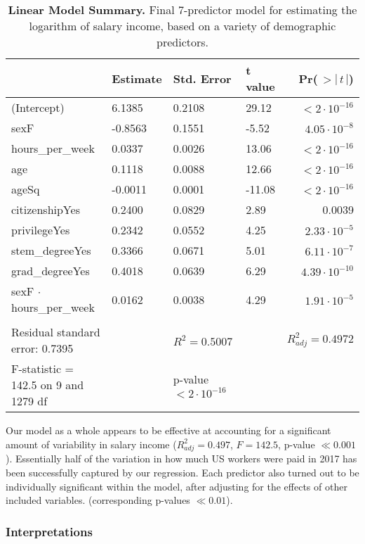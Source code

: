 \documentclass{article}
\begin{document}
\begin{table}[ht]
\centering
\begin{tabular}{llllr}
  \toprule
  & Estimate & Std. Error & t value & Pr($\,>|\,t\,|$) \\ 
  \midrule
  (Intercept) & 6.1385 & 0.2108 & 29.12 & $< 2 \cdot 10^{-16}$ \\ 
  sexF & -0.8563 & 0.1551 & -5.52 & $4.05 \cdot 10^{-8}$ \\ 
  hours\_per\_week & 0.0337 & 0.0026 & 13.06 & $< 2 \cdot 10^{-16}$ \\ 
  age & 0.1118 & 0.0088 & 12.66 & $< 2 \cdot 10^{-16}$ \\ 
  ageSq & -0.0011 & 0.0001 & -11.08 & $< 2 \cdot 10^{-16}$ \\ 
  citizenshipYes & 0.2400 & 0.0829 & 2.89 & 0.0039 \\ 
  privilegeYes & 0.2342 & 0.0552 & 4.25 & $2.33 \cdot 10^{-5}$ \\ 
  stem\_degreeYes & 0.3366 & 0.0671 & 5.01 & $6.11 \cdot 10^{-7}$ \\ 
  grad\_degreeYes & 0.4018 & 0.0639 & 6.29 & $4.39 \cdot 10^{-10}$ \\ 
  sexF $\cdot$ hours\_per\_week & 0.0162 & 0.0038 & 4.29 & $1.91 \cdot 10^{-5}$ \\ 
  \bottomrule \\
  Residual standard error: 0.7395 & & $R^2 = 0.5007$ &  & $R^2_{adj} = 0.4972$ \\
  F-statistic = 142.5 on 9 and 1279 df & & p-value $< 2 \cdot 10^{-16}$
\end{tabular}
\caption{\textbf{Linear Model Summary.} Final 7-predictor model for estimating the logarithm of salary income, based on a variety of demographic predictors.}
\label{linear_model}
\end{table}

Our model as a whole appears to be effective at accounting for a significant amount of variability in salary income ($R^2_{adj} = 0.497$, $F = 142.5$, p-value $\ll 0.001$). Essentially half of the variation in how much US workers were paid in 2017 has been successfully captured by our regression. Each predictor also turned out to be individually significant within the model, after adjusting for the effects of other included variables. (corresponding p-values $\ll 0.01$).

\subsubsection{Interpretations}
\end{document}
